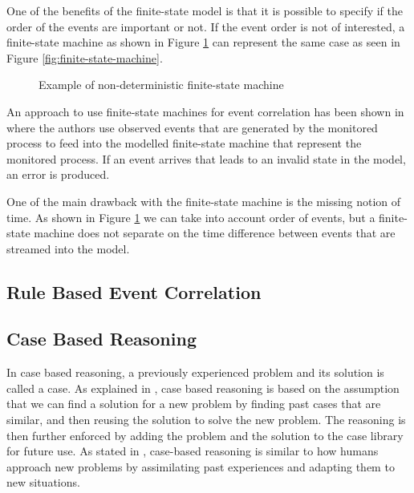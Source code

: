 One of the benefits of the finite-state model is that it is possible to specify if the order of the events are important or not. If the event order is not of interested, a finite-state machine as shown in Figure \ref{fig:finite-state-machine-2} can represent the same case as seen in Figure \ref{fig:finite-state-machine}.
\begin{figure}[ht]
\centering
{}
\caption{Example of non-deterministic finite-state machine}
\label{fig:finite-state-machine-2}
\end{figure}

An approach to use finite-state machines for event correlation has been shown in \cite{Bouloutas_1992} where the authors use observed events that are generated by the monitored process to feed into the modelled finite-state machine that represent the monitored process. If an event arrives that leads to an invalid state in the model, an error is produced.

One of the main drawback with the finite-state machine is the missing notion of time. As shown in Figure \ref{fig:finite-state-machine-2} we can take into account order of events, but a finite-state machine does not separate on the time difference between events that are streamed into the model.

\subsection{Rule Based Event Correlation}
\subsection{Case Based Reasoning}

In case based reasoning, a previously experienced problem and its solution is called a case. As explained in \cite{aamodt_1994}, case based reasoning is based on the assumption that we can find a solution for a new problem by finding past cases that are similar, and then reusing the solution to solve the new problem. The reasoning is then further enforced by adding the problem and the solution to the case library for future use.
As stated in \cite{slade_1991}, case-based reasoning is similar to how humans approach new problems by assimilating past experiences and adapting them to new situations.

